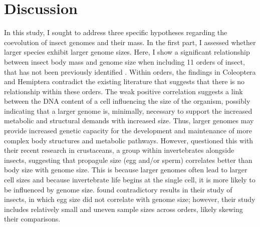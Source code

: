\documentclass[11pt]{article}
\begin{document}
\clearpage
\pagebreak


\section{Discussion}
In this study, I sought to address three specific hypotheses regarding the coevolution of insect genomes and their mass. In the first part, I assessed whether larger species exhibit larger genome sizes. Here, I show a significant relationship between insect body mass and genome size when including 11 orders of insect, that has not been previously identified \citep{propagule}. Within orders, the findings in Coleoptera and Hemiptera contradict the existing literature that suggests that there is no relationship within these orders. The weak positive correlation suggests a link between the DNA content of a cell influencing the size of the organism, possibly indicating that a larger genome is, minimally, necessary to support the increased metabolic and structural demands with increased size. Thus, larger genomes may provide increased genetic capacity for the development and maintenance of more complex body structures and metabolic pathways. However, \cite{propagule} questioned this with their recent research in crustaceans, a group within invertebrates alongside insects, suggesting that propagule size (egg and/or sperm) correlates better than body size with genome size. This is because larger genomes often lead to larger cell sizes and because invertebrate life begins at the single cell, it is more likely to be influenced by genome size. \cite{insect-egg-genome} found contradictory results in their study of insects, in which egg size did not correlate with genome size; however, their study includes relatively small and uneven sample sizes across orders, likely skewing their comparisons.
\end{document}
